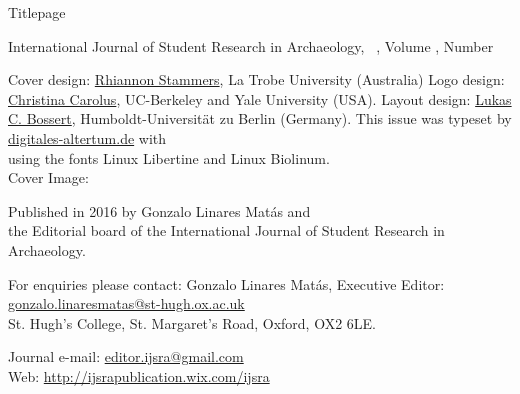 	\begin{titlepage}
		Titlepage
	\end{titlepage}	
\thispagestyle{empty}
\hfill
\vfill

\begin{footnotesize}
\noindent International Journal of Student Research in Archaeology,\newline
\IJSRAmonth\ \IJSRAyear , Volume \IJSRAvolume , Number \IJSRAnumber\\
\vspace{2em}


\noindent Cover design: \href{https://latrobe.academia.edu/RhiannonStammers}{Rhiannon Stammers}, La Trobe University (Australia)\newline
\noindent Logo design: \href{https://hraf.yale.edu/about/staff/christina-carolus/}{Christina Carolus}, UC-Berkeley and Yale University (USA).\newline
\noindent Layout design: \href{https://hu-berlin.academia.edu/LukasCBossert}{Lukas C. Bossert}, Humboldt-Universität zu Berlin (Germany). \newline \indent This issue was typeset by \href{www.digitales-altertum.de}{digitales-altertum.de}  with  \\ \indent using the fonts Linux Libertine and {\sffamily Linux Biolinum}.\\
Cover Image: 

\vspace{2em}

\noindent Published in 2016 by Gonzalo Linares Matás and \\ the Editorial board of the International Journal of Student Research in Archaeology. 




\vspace{2em}






\noindent For enquiries please contact: Gonzalo Linares Matás, Executive Editor:\\ \href{mailto:gonzalo.linaresmatas@st-hugh.ox.ac.uk}{gonzalo.linaresmatas@st-hugh.ox.ac.uk}\\  St. Hugh’s College, St. Margaret’s Road, Oxford, OX2 6LE.

\noindent Journal e-mail: \href{mailto:editor.ijsra@gmail.com}{editor.ijsra@gmail.com}\\
\noindent Web: \href{http://ijsrapublication.wix.com/ijsra}{http://ijsrapublication.wix.com/ijsra}


\end{footnotesize}

